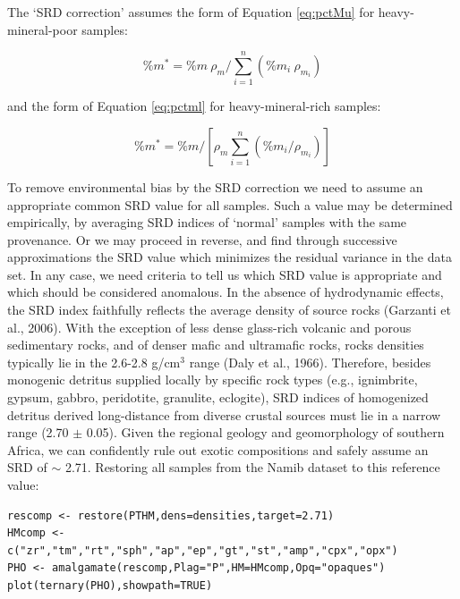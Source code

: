 \documentclass{article}
\begin{document}
The `SRD correction' assumes the form of Equation \ref{eq:pctMu} for
heavy-mineral-poor samples:

\begin{equation}
\%m^* = \%m ~ \rho_m / \sum_{i=1}^{n} (\%m_i ~ \rho_{m_i})
\label{eq:SRDlight}
\end{equation}

and the form of Equation \ref{eq:pctml} for heavy-mineral-rich samples:

\begin{equation}
\%m^* = \%m / [ \rho_m \sum_{i=1}^{n} (\%m_i / \rho_{m_i}) ]
\label{eq:SRDheavy}
\end{equation}

To remove environmental bias by the SRD correction we need to assume
an appropriate common SRD value for all samples. Such a value may be
determined empirically, by averaging SRD indices of `normal' samples
with the same provenance. Or we may proceed in reverse, and find
through successive approximations the SRD value which minimizes the
residual variance in the data set. In any case, we need criteria to
tell us which SRD value is appropriate and which should be considered
anomalous.  In the absence of hydrodynamic effects, the SRD index
faithfully reflects the average density of source rocks (Garzanti et
al., 2006). With the exception of less dense glass-rich volcanic and
porous sedimentary rocks, and of denser mafic and ultramafic rocks,
rocks densities typically lie in the 2.6-2.8 g/cm$^3$ range (Daly et
al., 1966). Therefore, besides monogenic detritus supplied locally by
specific rock types (e.g., ignimbrite, gypsum, gabbro, peridotite,
granulite, eclogite), SRD indices of homogenized detritus derived
long-distance from diverse crustal sources must lie in a narrow range
(2.70 $\pm$ 0.05). Given the regional geology and geomorphology of
southern Africa, we can confidently rule out exotic compositions and
safely assume an SRD of $\sim$ 2.71. Restoring all samples from the
Namib dataset to this reference value:

\begin{verbatim}
rescomp <- restore(PTHM,dens=densities,target=2.71)
HMcomp <- c("zr","tm","rt","sph","ap","ep","gt","st","amp","cpx","opx")
PHO <- amalgamate(rescomp,Plag="P",HM=HMcomp,Opq="opaques")
plot(ternary(PHO),showpath=TRUE)
\end{verbatim}
\end{document}
